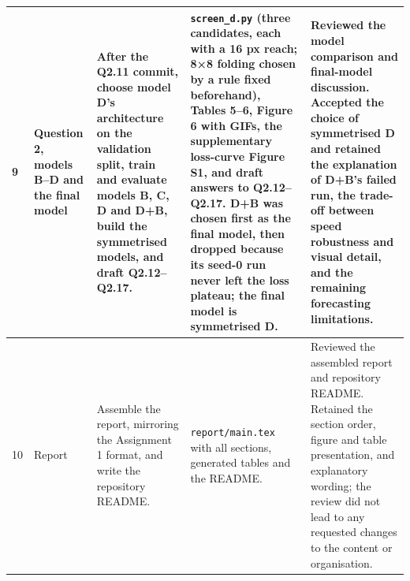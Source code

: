 {\begin{longtable}{p{}p{}p{}p{}p{}}
9 & Question 2, models B--D and the final model & After the Q2.11 commit, choose model D's architecture on the validation split, train and evaluate models B, C, D and D+B, build the symmetrised models, and draft Q2.12--Q2.17. & \texttt{screen\_d.py} (three candidates, each with a 16 px reach; 8×8 folding chosen by a rule fixed beforehand), Tables 5--6, Figure 6 with GIFs, the supplementary loss-curve Figure S1, and draft answers to Q2.12--Q2.17. D+B was chosen first as the final model, then dropped because its seed-0 run never left the loss plateau; the final model is symmetrised D. & Reviewed the model comparison and final-model discussion. Accepted the choice of symmetrised D and retained the explanation of D+B's failed run, the trade-off between speed robustness and visual detail, and the remaining forecasting limitations. \\ \midrule
10 & Report & Assemble the report, mirroring the Assignment 1 format, and write the repository README. & \texttt{report/main.tex} with all sections, generated tables and the README. & Reviewed the assembled report and repository README. Retained the section order, figure and table presentation, and explanatory wording; the review did not lead to any requested changes to the content or organisation. \\ \midrule
\bottomrule
\end{longtable}
}
